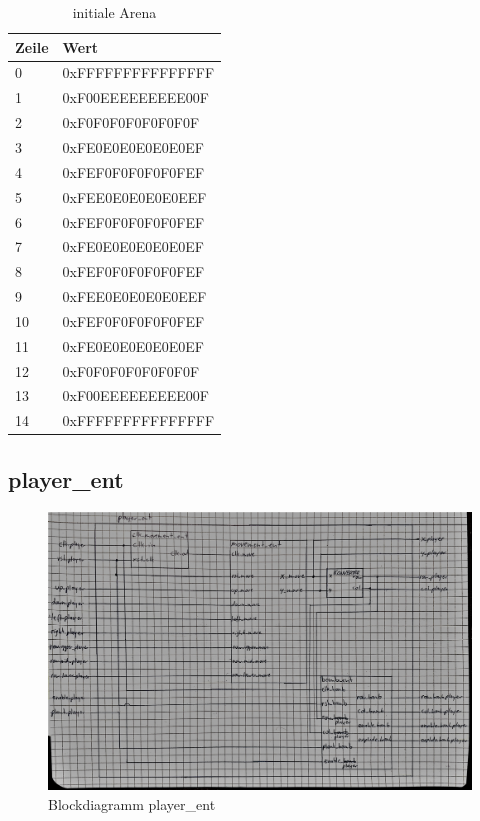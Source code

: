 \documentclass[parskip=full]{scrartcl}
\begin{document}
				\begin{table}[H]
					\centering
					\label{initialMap}
					\begin{tabular}{|l|l|}
						\hline
						\textbf{Zeile} & \textbf{Wert}      \\ \hline
						0           &      0xFFFFFFFFFFFFFFF          \\ 
						1          &          0xF00EEEEEEEEE00F        \\ 
						2           &           0xF0F0F0F0F0F0F0F           \\ 
						3           &      0xFE0E0E0E0E0E0EF   \\ 
						4           &    0xFEF0F0F0F0F0FEF  \\ 
						5           &     0xFEE0E0E0E0E0EEF \\ 
						6           &     0xFEF0F0F0F0F0FEF \\ 
						7           &    0xFE0E0E0E0E0E0EF  \\ 
						8           &   0xFEF0F0F0F0F0FEF   \\ 
						9           &     0xFEE0E0E0E0E0EEF \\ 
						10           &    0xFEF0F0F0F0F0FEF  \\ 
						11           &   0xFE0E0E0E0E0E0EF   \\ 
						12           &    0xF0F0F0F0F0F0F0F  \\ 
						13           &    0xF00EEEEEEEEE00F  \\ 
						14           &    0xFFFFFFFFFFFFFFF  \\ \hline
					\end{tabular}
					\caption{initiale Arena}
				\end{table}			

			\subsection{player\_ent}
				\begin{figure}[H]
					\centering
					\includegraphics[scale=0.15]{./bilder/player.jpg}
					\caption{Blockdiagramm player\_ent}
				\end{figure}
			
\end{document}
